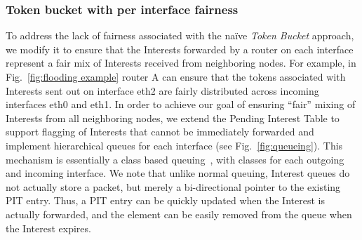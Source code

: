 \documentclass[10pt,conference]{IEEEtran}
\renewcommand{\texttt}[1]{{\nicettfont #1}}
\begin{document}
%
%
%


\subsubsection{\textbf{Token bucket with per interface fairness}}
\label{sec:queuing}

To address the lack of fairness associated with the na\"ive {\it Token Bucket} approach, we modify it to ensure that the Interests forwarded by a router on each interface represent a fair mix of Interests received from neighboring nodes. For example, in Fig.~\ref{fig:flooding example} router A can ensure that the tokens associated with Interests sent out on interface {\texttt eth2}  are fairly distributed across incoming interfaces \texttt{eth0} and \texttt{eth1}. 
In order to achieve our goal of ensuring ``fair'' mixing of Interests from all neighboring nodes, 
we extend the Pending Interest Table to support flagging of Interests that cannot be immediately forwarded and implement hierarchical queues for each interface (see Fig.~\ref{fig:queueing}). 
This mechanism is essentially a class based queuing~\cite{floyd1995link}, with classes for each outgoing and incoming interface.
We note that unlike normal queuing, Interest queues do not actually store a packet, but merely a bi-directional pointer to the existing PIT entry.
Thus, a PIT entry can be quickly updated when the Interest is actually forwarded, and the element can be easily removed from the queue when the Interest expires.
\end{document}
